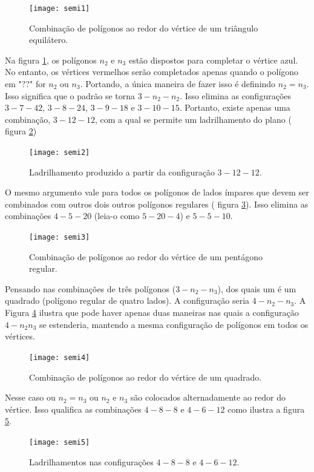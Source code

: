 \begin{figure}[H]
\centering
\texttt{[image: semi1]}
\label{semi1}
\caption{Combinação de polígonos ao redor do vértice de um triângulo equilátero.}
\end{figure}

Na figura \ref{semi1}, os polígonos $n_2$ e $n_3$ estão dispostos para completar o vértice azul. No entanto, os vértices vermelhos serão completados apenas quando o polígono em "$??$" for $n_2$ ou $n_3$. Portando, a única maneira de fazer isso é definindo $n_2 = n_3$. Isso significa que o padrão se torna $3-n_2- n_2$. 
Isso elimina as configurações $3-7-42$, $3-8-24$, $3-9-18$ e $3-10-15$. Portanto, existe apenas uma combinação, $3-12-12$, com a qual se permite um ladrilhamento do plano ( figura \ref{semi2})

\begin{figure}[H]
\centering
\texttt{[image: semi2]}
\label{semi2}
\caption{Ladrilhamento produzido a partir da configuração $3-12-12$.}
\end{figure}

O mesmo argumento vale para todos os polígonos de lados ímpares que devem ser combinados com outros dois outros polígonos regulares ( figura \ref{semi3}). Isso elimina as combinações $4-5-20$ (leia-o como $5-20-4$) e $5-5-10$.


\begin{figure}[H]
\centering
\texttt{[image: semi3]}
\label{semi3}
\caption{Combinação de polígonos ao redor do vértice de um pentágono regular.}
\end{figure}

Pensando nas combinações de três polígonos ($3-n_2-n_3$), dos quais um é um quadrado (polígono regular de quatro lados). A  configuração seria $4-n_2-n_3$. A Figura \ref{semi4} ilustra que pode haver apenas duas maneiras nas quais a configuração $4-n_2n_3$ se estenderia, mantendo a mesma configuração de polígonos em todos os vértices. 

\begin{figure}[H]
\centering
\texttt{[image: semi4]}
\label{semi4}
\caption{Combinação de polígonos ao redor do vértice de um quadrado.}
\end{figure}

Nesse caso ou $n_2= n_3$ ou $n_2$ e $n_3$ são colocados alternadamente ao redor do vértice. Isso qualifica as combinações $4-8-8$ e $4-6-12$ como ilustra a figura \ref{semi5}.

\begin{figure}[H]
\centering
\texttt{[image: semi5]}
\label{semi5}
\caption{Ladrilhamentos nas configurações $4-8-8$ e $4-6-12$.}
\end{figure}

